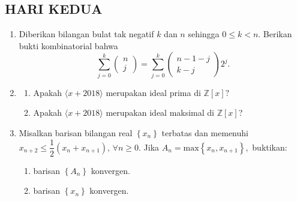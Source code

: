 \documentclass[12pt,twoside]{article}
\begin{document}
\subsection{HARI KEDUA}
\begin{enumerate}
    \item Diberikan bilangan bulat tak negatif $k$ dan $n$ sehingga $0 \leq k <n$. Berikan bukti kombinatorial bahwa
          \begin{equation*}
              \displaystyle\sum_{j=0}^{k} \begin{pmatrix}
                  n \\j
              \end{pmatrix} = \sum_{j=0}^{k}\begin{pmatrix}
                  n-1-j \\k-j
              \end{pmatrix}2^j.
          \end{equation*}


    \item \begin{enumerate}
              \item Apakah $\langle x+2018 \rangle$ merupakan ideal prima di $\mathbb{Z}[x]?$
              \item Apakah $\langle x+2018 \rangle$ merupakan ideal maksimal di $\mathbb{Z}[x]$?
          \end{enumerate}


    \item Misalkan barisan bilangan real $\left\lbrace x_n \right\rbrace$ terbatas dan memenuhi $x_{n+2} \leq \dfrac{1}{2} (x_n+x_{n+1}),\,\forall n \geq 0$. Jika $A_n = \text{max}\left\lbrace x_n,x_{n+1} \right\rbrace,$ buktikan:
          \begin{enumerate}
              \item barisan $\left\lbrace A_n \right\rbrace$ konvergen.
              \item barisan $\left\lbrace x_n \right\rbrace$ konvergen.
          \end{enumerate}



\end{enumerate}
\end{document}
